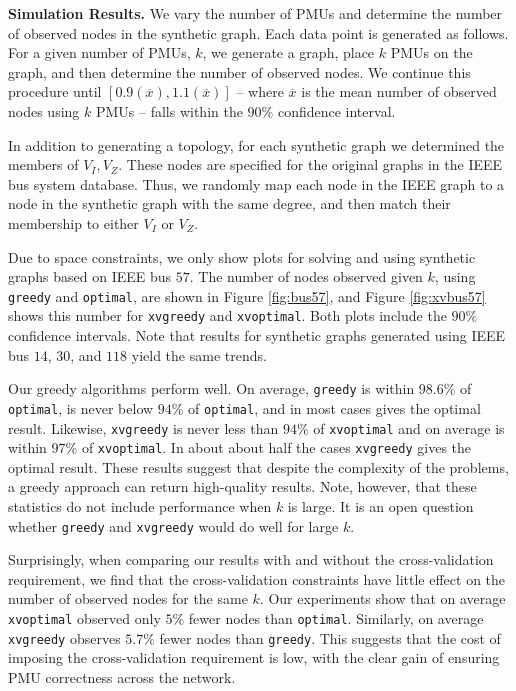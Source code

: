 
\textbf{Simulation Results.}
We vary the number of PMUs and determine the number of observed nodes in the synthetic graph. 
Each data point is generated as follows. For a given number of PMUs, $k$, we generate a graph, place $k$ PMUs on the graph, and then determine the number of observed nodes. 
We continue this procedure until $[0.9(\overline{x}),1.1(\overline{x})]$ -- where $\overline{x}$ is the mean number of observed nodes using $k$ PMUs -- falls within the $90\%$ confidence interval.

In addition to generating a topology, for each synthetic graph we determined the members of $V_I, V_Z$. These nodes are specified for the original graphs in the IEEE bus system database. Thus, 
we randomly map each node in the IEEE graph to a node in the synthetic graph with the same degree, and then match their membership to either $V_I$ or $V_Z$.

Due to space constraints, we only show plots for solving \maxinc and \xvalpart using synthetic graphs based on IEEE bus $57$.  
The number of nodes observed given $k$, using {\tt greedy} and {\tt optimal}, are shown in Figure \ref{fig:bus57}, and Figure \ref{fig:xvbus57} shows this number 
for {\tt xvgreedy} and {\tt xvoptimal}.  Both plots include the $90\%$ confidence intervals. 
Note that results for synthetic graphs generated using IEEE bus $14$, $30$, and $118$ yield the same trends.

Our greedy algorithms perform well. On average, {\tt greedy} is within $98.6\%$ of {\tt optimal},
is never below $94\%$ of {\tt optimal}, and in most cases gives the optimal result.
Likewise, {\tt xvgreedy} is never less than $94 \%$ of {\tt xvoptimal} and on average is within $97\%$ of {\tt xvoptimal}. In about about half the cases {\tt xvgreedy} gives the optimal result.
These results suggest that despite the complexity of the problems, a greedy approach can return high-quality results. Note, however, that these statistics do not include performance when
$k$ is large.  It is an open question whether {\tt greedy} and {\tt xvgreedy} would do well for large $k$. 

Surprisingly, when comparing our results with and without the cross-validation requirement, we find that the cross-validation constraints have little effect on the number of observed nodes 
for the same $k$. Our experiments show that on average {\tt xvoptimal} observed only $5\%$ fewer nodes than {\tt optimal}.  Similarly, on average {\tt xvgreedy} observes
 $5.7\%$ fewer nodes than {\tt greedy}. This suggests that the cost of imposing the cross-validation requirement is low, with the clear gain of ensuring PMU correctness across the network.


